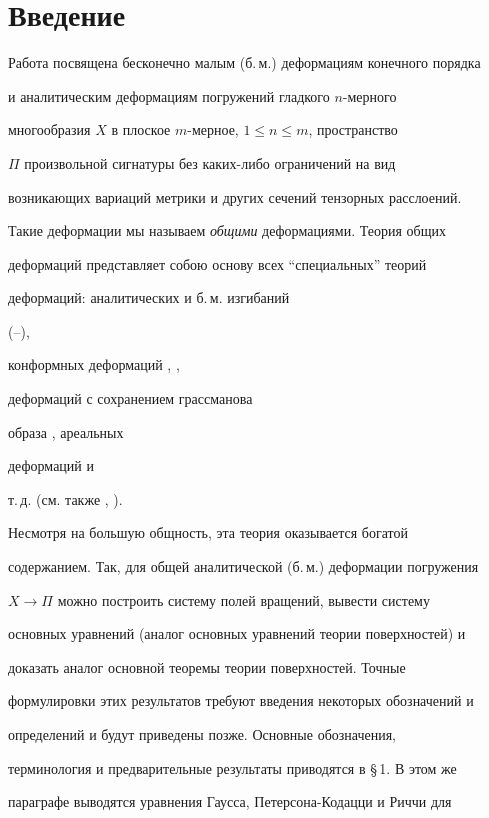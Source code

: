  


\section*{Введение}





Работа посвящена бесконечно малым (б.\,м.) деформациям конечного порядка


и аналитическим деформациям погружений гладкого $n$-мерного


многообразия $X$ в плоское $m$-мерное, $1\le n\le m$, пространство


$\Pi$ произвольной сигнатуры без каких-либо ограничений на вид


возникающих вариаций метрики и других сечений тензорных расслоений.


Такие деформации мы называем {\it общими} деформациями. Теория общих


деформаций представляет собою основу всех ``специальных'' теорий


деформаций: аналитических и б.\,м. изгибаний


(\cite{Efi}--\cite{Iva2}),


конформных деформаций \cite{Car1}, \cite{DoC},


деформаций с сохранением грассманова


образа \cite{Fom}, ареальных


деформаций \cite{Bes} и


т.\,д. (см. также \cite{Yano}, \cite{Chen}).


Несмотря на большую общность, эта теория оказывается богатой


содержанием. Так, для общей аналитической (б.\,м.) деформации погружения


$X\to\Pi$ можно построить систему полей вращений, вывести систему


основных уравнений (аналог основных уравнений теории поверхностей) и


доказать аналог основной теоремы теории поверхностей. Точные


формулировки этих результатов требуют введения некоторых обозначений и


определений и будут приведены позже. Основные обозначения,


терминология и предварительные результаты приводятся в \S\,1. В этом же


параграфе выводятся уравнения Гаусса, Петерсона-Кодацци и Риччи для


